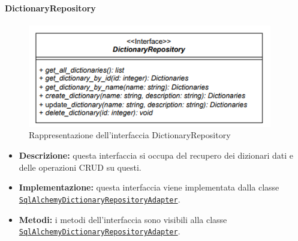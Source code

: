 \paragraph{DictionaryRepository} \label{DictionaryRepository}
\begin{figure}[H]
    \centering
    \includegraphics[width=0.95\textwidth]{assets/Backend/dictionary_repository.png}
    \caption{Rappresentazione dell'interfaccia DictionaryRepository}
  \end{figure}
\begin{itemize}
    \item \textbf{Descrizione:} questa interfaccia si occupa del recupero dei dizionari dati e delle operazioni CRUD su questi.
    \item \textbf{Implementazione:} questa interfaccia viene implementata dalla classe \hyperref[SqlAlchemyDictionaryRepositoryAdapter]{\texttt{SqlAlchemyDictionaryRepositoryAdapter}}.
    \item \textbf{Metodi:} i metodi dell'interfaccia sono visibili alla classe \hyperref[SqlAlchemyDictionaryRepositoryAdapter]{\texttt{SqlAlchemyDictionaryRepositoryAdapter}}.
\end{itemize} 


